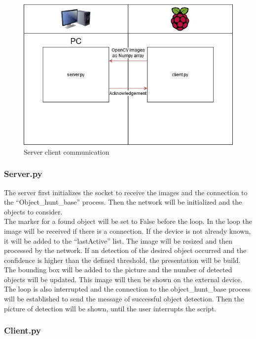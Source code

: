 \begin{figure}[H]
\centering
\includegraphics[scale=0.8]{sources/client_server.jpg}
\caption[Server client communication]{Server client communication}
\label{fig:depthwise_convolution}
\end{figure}

\subsubsection{Server.py}

The server first initializes the socket to receive the images and the connection to the ``Object\_hunt\_base'' process. Then the network will be initialized and the objects to consider.\\

The marker for a found object will be set to False before the loop. In the loop the image will be received if there is a connection. If the device is not already known, it will be added to the ``lastActive'' list. The image will be resized and then processed by the network.  If an detection of the desired object occurred and the confidence is higher than the defined threshold, the presentation will be build. The bounding box will be added to the picture and the number of detected objects will be updated. This image will then be shown on the external device. The loop is also interrupted and the connection to the object\_hunt\_base process will be established to send the message of successful object detection. Then the picture of detection will be shown, until the user interrupts the script.

\subsubsection{Client.py}

